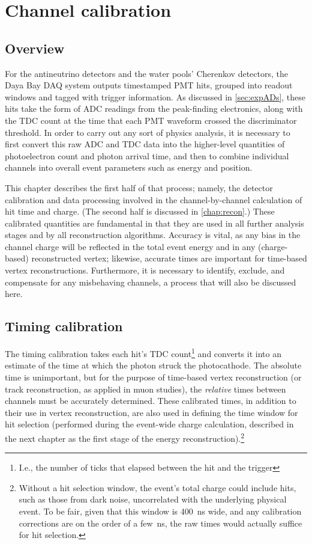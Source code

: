 \documentclass[../thesis.tex]{subfiles}
\begin{document}
\chapter{Channel calibration}
\label{chap:calib}

\section{Overview}

For the antineutrino detectors and the water pools' Cherenkov detectors, the Daya Bay DAQ system outputs timestamped PMT hits, grouped into readout windows and tagged with trigger information. As discussed in \autoref{sec:expADs}, these hits take the form of ADC readings from the peak-finding electronics, along with the TDC count at the time that each PMT waveform crossed the discriminator threshold. In order to carry out any sort of physics analysis, it is necessary to first convert this raw ADC and TDC data into the higher-level quantities of photoelectron count and photon arrival time, and then to combine individual channels into overall event parameters such as energy and position.

This chapter describes the first half of that process; namely, the detector calibration and data processing involved in the channel-by-channel calculation of hit time and charge. (The second half is discussed in \autoref{chap:recon}.) These calibrated quantities are fundamental in that they are used in all further analysis stages and by all reconstruction algorithms. Accuracy is vital, as any bias in the channel charge will be reflected in the total event energy and in any (charge-based) reconstructed vertex; likewise, accurate times are important for time-based vertex reconstructions. Furthermore, it is necessary to identify, exclude, and compensate for any misbehaving channels, a process that will also be discussed here.

\section{Timing calibration}
\label{sec:calibTiming}

The timing calibration takes each hit's TDC count\footnote{I.e., the number of ticks that elapsed between the hit and the trigger} and converts it into an estimate of the time at which the photon struck the photocathode. The absolute time is unimportant, but for the purpose of time-based vertex reconstruction (or track reconstruction, as applied in muon studies), the \emph{relative} times between channels must be accurately determined. These calibrated times, in addition to their use in vertex reconstruction, are also used in defining the time window for hit selection (performed during the event-wide charge calculation, described in the next chapter as the first stage of the energy reconstruction).\footnote{Without a hit selection window, the event's total charge could include hits, such as those from dark noise, uncorrelated with the underlying physical event. To be fair, given that this window is 400~ns wide, and any calibration corrections are on the order of a few~ns, the raw times would actually suffice for hit selection.}
\end{document}
